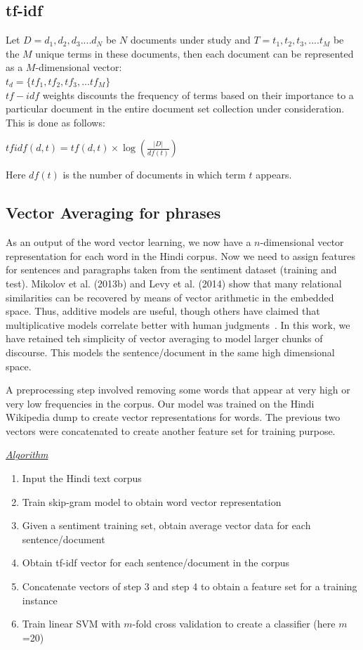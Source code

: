 \documentclass[11pt,a4paper]{article}
\begin{document}
\subsection{tf-idf}
\label{subsec:tfidf}
Let $D=d_1, d_2, d_3....d_N$ be $N$ documents under study and $T=t_1, t_2, t_3,....t_M$ be the $M$ unique terms in these documents, then each document can be represented as a $M$-dimensional vector:\\
$t_d=\{tf_1,tf_2,tf_3,...tf_M\}$\\
$tf-idf$ weights discounts the frequency of terms based on their importance to a particular document in the entire document set collection under consideration. This is done as follows:
\begin{center}
$tfidf(d,t)=tf(d,t) \times \log(\frac{|D|}{df(t)})$ 
\end{center}
Here $df(t)$ is the number of documents in which term $t$ appears.

\subsection{Vector Averaging for phrases}
\label{sec:vectoraveraging}
As an output of the word vector learning, we now have a $n$-dimensional
vector representation for each word in the Hindi corpus.  Now we need to
assign features for sentences and paragraphs taken from the sentiment dataset
(training and test).  Mikolov et al. (2013b) and Levy et al. (2014) show that
many relational similarities can be recovered by means of vector arithmetic
in the embedded space.  Thus, additive models are useful, though
others have claimed that multiplicative models correlate better with human
judgments~\cite{Mitchell:08,Socher:13}.  In this work, we have retained teh
simplicity of vector averaging to model larger chunks of  discourse.
This models the sentence/document in the same high dimensional space.

A preprocessing step involved removing some words that appear at very high or
very low frequencies in the corpus.  
Our model was trained on the Hindi Wikipedia dump to create vector
representations for words. The previous two vectors were concatenated to
create another feature set for training purpose.  

\underline{\emph{Algorithm}}
\begin{enumerate}
\item Input the Hindi text corpus
\item Train skip-gram model to obtain word vector representation
\item Given a sentiment training set, obtain average vector data for each sentence/document
\item Obtain tf-idf vector for each sentence/document in the corpus
\item Concatenate vectors of step 3 and step 4 to obtain a feature set for a training instance
\item Train linear SVM with $m$-fold cross validation to create a classifier
(here $m$=20)
\end{enumerate}
\end{document}

